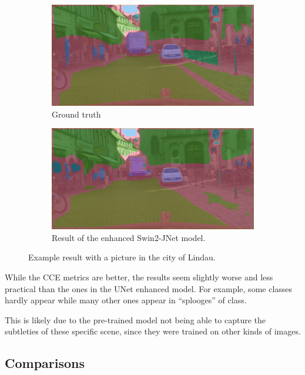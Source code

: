 \begin{figure}[h]
	\begin{subfigure}{.5\textwidth}
		\includegraphics[width=\textwidth]{city_images/swin2_gt_pic.png}
		\caption{Ground truth}
	\end{subfigure}
	\begin{subfigure}{.5\textwidth}
		\includegraphics[width=\textwidth]{city_images/swin2_pic.png}
		\caption{Result of the enhanced Swin2-JNet model.}
	\end{subfigure}
	\caption{Example result with a picture in the city of Lindau.}
\end{figure}

While the CCE metrics are better, the results seem slightly worse and less practical than the ones in the UNet enhanced model.
For example, some classes hardly appear while many other ones appear in ``splooges'' of class.

This is likely due to the pre-trained model not being able to capture the subtleties of these specific scene, since they were trained on other kinds of images.

\newpage{}

\subsection{Comparisons}

